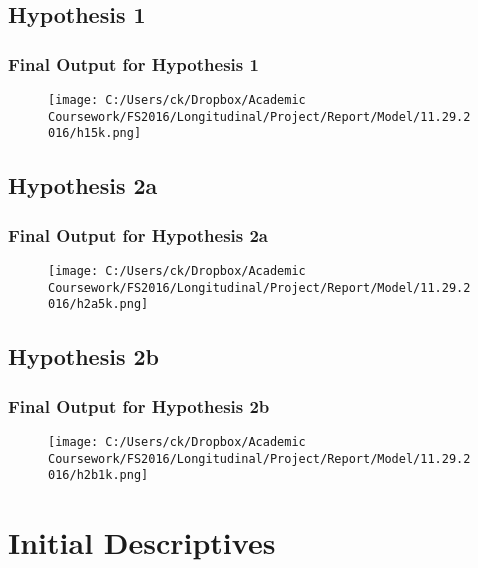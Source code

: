 \documentclass[10pt,a4paper,fleqn]{article}
\begin{document}
\subsection{Hypothesis 1}
\subsubsection{Final Output for Hypothesis 1}
\begin{figure}[!ht]
\label{h1f}
\texttt{[image: C:/Users/ck/Dropbox/Academic Coursework/FS2016/Longitudinal/Project/Report/Model/11.29.2016/h15k.png]}
\end{figure}
\newpage

\subsection{Hypothesis 2a}
\subsubsection{Final Output for Hypothesis 2a}
\begin{figure}[!ht]
\label{h2af}
\texttt{[image: C:/Users/ck/Dropbox/Academic Coursework/FS2016/Longitudinal/Project/Report/Model/11.29.2016/h2a5k.png]}
\end{figure}
\newpage

\subsection{Hypothesis 2b}
\subsubsection{Final Output for Hypothesis 2b}
\begin{figure}[!ht]
\label{h2bf}
\texttt{[image: C:/Users/ck/Dropbox/Academic Coursework/FS2016/Longitudinal/Project/Report/Model/11.29.2016/h2b1k.png]}
\end{figure}

\newpage	
\section{Initial Descriptives}
\end{document}
